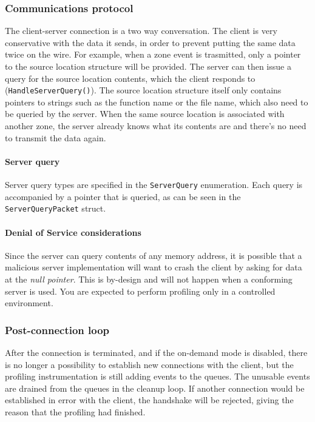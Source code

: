 \documentclass[hidelinks,titlepage,a4paper]{article}
\begin{document}
\subsubsection{Communications protocol}
\label{communicationsprotocol}

The client-server connection is a two way conversation. The client is very conservative with the data it sends, in order to prevent putting the same data twice on the wire. For example, when a zone event is trasmitted, only a pointer to the source location structure will be provided. The server can then issue a query for the source location contents, which the client responds to (\texttt{HandleServerQuery()}). The source location structure itself only contains pointers to strings such as the function name or the file name, which also need to be queried by the server. When the same source location is associated with another zone, the server already knows what its contents are and there's no need to transmit the data again.

\paragraph{Server query}

Server query types are specified in the \texttt{ServerQuery} enumeration. Each query is accompanied by a pointer that is queried, as can be seen in the \texttt{ServerQueryPacket} struct.

\paragraph{Denial of Service considerations}

Since the server can query contents of any memory address, it is possible that a malicious server implementation will want to crash the client by asking for data at the \emph{null pointer}. This is by-design and will not happen when a conforming server is used. You are expected to perform profiling only in a controlled environment.

\subsubsection{Post-connection loop}

After the connection is terminated, and if the on-demand mode is disabled, there is no longer a possibility to establish new connections with the client, but the profiling instrumentation is still adding events to the queues. The unusable events are drained from the queues in the cleanup loop. If another connection would be established in error with the client, the handshake will be rejected, giving the reason that the profiling had finished.
\end{document}
